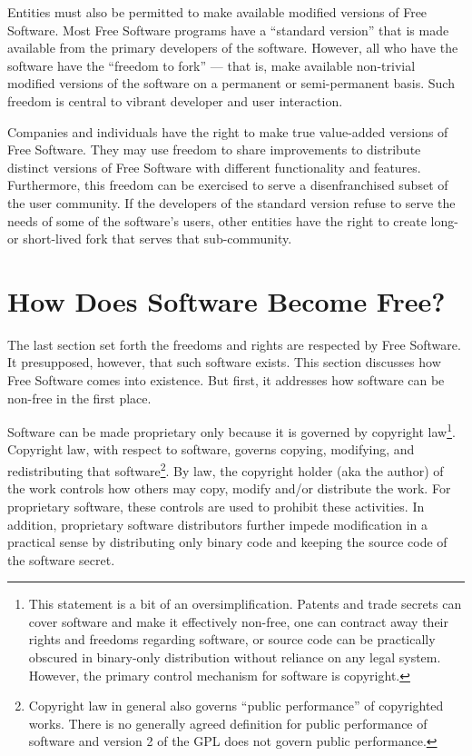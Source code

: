 \documentclass[12pt]{report}
\begin{document}
Entities must also be permitted to make available modified versions of
Free Software.  Most Free Software programs have a ``standard version''
that is made available from the primary developers of the software.
However, all who have the software have the ``freedom to fork'' --- that
is, make available non-trivial modified versions of the software on a
permanent or semi-permanent basis.  Such freedom is central to vibrant
developer and user interaction.

Companies and individuals have the right to make true value-added versions
of Free Software.  They may use freedom to share improvements to
distribute distinct versions of Free Software with different functionality
and features.  Furthermore, this freedom can be exercised to serve a
disenfranchised subset of the user community.  If the developers of the
standard version refuse to serve the needs of some of the software's
users, other entities have the right to create long- or short-lived fork
that serves that sub-community.

\section{How Does Software Become Free?}

The last section set forth the freedoms and rights are respected by Free
Software.  It presupposed, however, that such software exists.  This
section discusses how Free Software comes into existence.  But first, it
addresses how software can be non-free in the first place.

Software can be made proprietary only because it is governed by copyright
law\footnote{This statement is a bit of an oversimplification.  Patents
  and trade secrets can cover software and make it effectively non-free,
  one can contract away their rights and freedoms regarding software, or
  source code can be practically obscured in binary-only distribution
  without reliance on any legal system.  However, the primary control
  mechanism for software is copyright.}.  Copyright law, with respect to
software, governs copying, modifying, and redistributing that
software\footnote{Copyright law in general also governs ``public
  performance'' of copyrighted works.  There is no generally agreed
  definition for public performance of software and version 2 of the GPL
  does not govern public performance.}.  By law, the copyright holder (aka
the author) of the work controls how others may copy, modify and/or
distribute the work.  For proprietary software, these controls are used to
prohibit these activities.  In addition, proprietary software distributors
further impede modification in a practical sense by distributing only
binary code and keeping the source code of the software secret.
\end{document}

